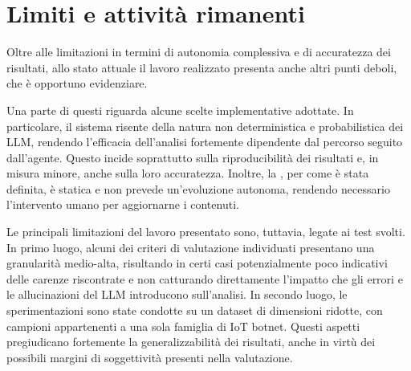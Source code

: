 
\section{Limiti e attività rimanenti}


Oltre alle limitazioni in termini di autonomia complessiva e di accuratezza dei risultati, allo stato attuale il lavoro realizzato presenta anche altri punti deboli, che è opportuno evidenziare. 

Una parte di questi riguarda alcune scelte implementative adottate. In particolare, il sistema risente della natura non deterministica e probabilistica dei LLM, rendendo l'efficacia dell'analisi fortemente dipendente dal percorso seguito dall'agente. Questo incide soprattutto sulla riproducibilità dei risultati e, in misura minore, anche sulla loro accuratezza. Inoltre, la \kb{}, per come è stata definita, è statica e non prevede un'evoluzione autonoma, rendendo necessario l'intervento umano per aggiornarne i contenuti.


Le principali limitazioni del lavoro presentato sono, tuttavia, legate ai test svolti. In primo luogo, alcuni dei criteri di valutazione individuati presentano una granularità medio-alta, risultando in certi casi potenzialmente poco indicativi delle carenze riscontrate e non catturando direttamente l'impatto che gli errori e le allucinazioni del LLM introducono sull'analisi. In secondo luogo, le sperimentazioni sono state condotte su un dataset di dimensioni ridotte, con campioni appartenenti a una sola famiglia di IoT botnet. Questi aspetti pregiudicano fortemente la generalizzabilità dei risultati, anche in virtù dei possibili margini di soggettività presenti nella valutazione.


